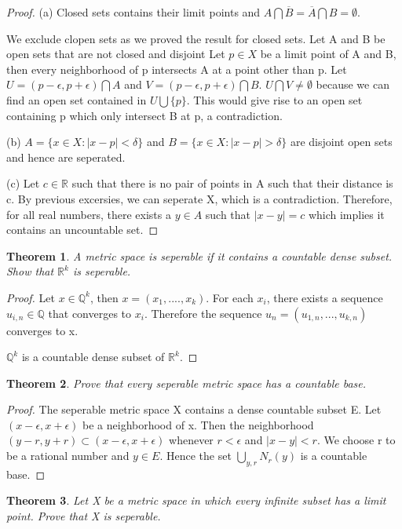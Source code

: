 \documentclass{article}
\theoremstyle{plain}
\newtheorem{theorem}{Theorem}
\theoremstyle{definition}
\begin{document}
\begin{proof}
	(a) Closed sets contains their limit points and $A \bigcap \overline{B} = \overline{A} \bigcap B = \emptyset$.

	We exclude clopen sets as we proved the result for closed sets. Let A and B be open sets that are not closed and disjoint Let $p \in X$ be a limit point of A and B, then every neighborhood of p intersects A at a point other than p. Let $ U = (p - \epsilon,p + \epsilon) \bigcap A$ and $V = (p - \epsilon, p + \epsilon) \bigcap B$. $U \bigcap V \not = \emptyset$ because we can find an open set contained in $U \bigcup \{ p \}$. This would give rise to an open set containing p which only intersect B at p, a contradiction.

	(b) $A = \{ x \in X: |x - p| < \delta \}$ and $B = \{x \in X: |x - p| > \delta \}$ are disjoint open sets and hence are seperated.

	(c) Let $c \in \mathbb{R}$ such that there is no pair of points in A such that their distance is c. By previous excersies, we can seperate X, which is a contradiction. Therefore, for all real numbers, there exists a $y \in A$ such that $|x - y| = c$ which implies it contains an uncountable set.
\end{proof}

\begin{theorem}
	A metric space is seperable if it contains a countable dense subset. Show that $\mathbb{R}^{k}$ is seperable.
\end{theorem}

\begin{proof}
	Let $x \in \mathbb{Q}^{k}$, then $x = ( x_{1},....,x_{k})$. For each $x_{i}$, there exists a sequence $u_{i,n} \in \mathbb{Q}$ that converges to $x_{i}$. Therefore the sequence $u_{n} = (u_{1,n},...,u_{k,n})$ converges to x.  

	$\mathbb{Q}^{k}$ is a countable dense subset of $\mathbb{R}^{k}$. 
\end{proof}

\begin{theorem}
	Prove that every seperable metric space has a countable base.
\end{theorem}
\begin{proof}
	The seperable metric space X contains a dense countable subset E. Let $(x - \epsilon, x + \epsilon)$ be a neighborhood of x. Then the neighborhood $(y - r, y + r) \subset ( x - \epsilon, x + \epsilon)$ whenever $r < \epsilon$ and $|x - y| < r$. We choose r to be a rational number and $y \in E$. Hence the set $\bigcup_{y,r}N_{r}(y)$ is a countable base. 
\end{proof}
\begin{theorem}
Let X be a metric space in which every infinite subset has a limit point. Prove that X is seperable.
\end{theorem}
\end{document}
